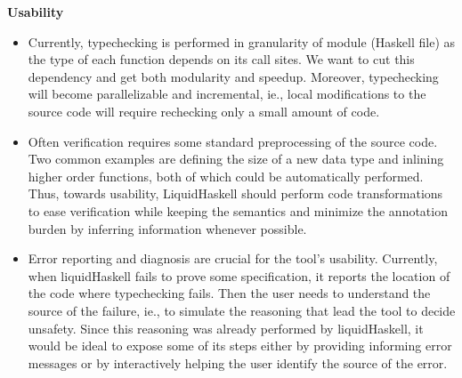 \textbf{Usability}
\begin{itemize}
\item Currently, typechecking is performed in granularity of module (Haskell file)
  as the type of each function depends on its call sites.
  We want to cut this dependency and get both modularity and speedup.
  Moreover, 
  typechecking will become parallelizable and incremental, ie., 
  local modifications to the source code will require rechecking
  only a small amount of code.


\item 
  Often verification requires some standard preprocessing of the source code. 
  Two common examples are 
  defining the size of a new data type and
  inlining higher order functions,
  both of which could be automatically performed.
  Thus, towards usability, LiquidHaskell should perform code transformations
  to ease verification while keeping the semantics
  and minimize the annotation burden by inferring information whenever possible.
  



\item Error reporting and diagnosis are crucial for the tool's usability.
  Currently, when liquidHaskell fails to prove some specification, 
  it reports the location of the code where typechecking fails.
  Then the user needs to understand the source of the failure, 
  ie., to simulate the reasoning that lead the tool to decide unsafety.
  Since this reasoning was already performed by liquidHaskell, 
  it would be ideal
  to expose some of its steps 
  either by providing informing error messages or 
  by interactively helping the user identify the source of the error.
\end{itemize}

